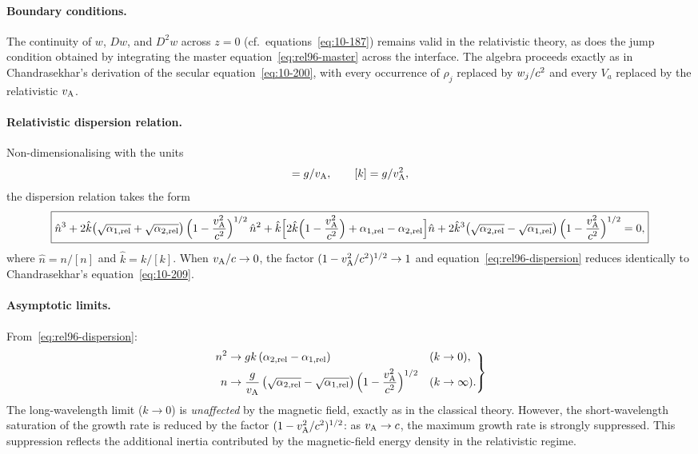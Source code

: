 \paragraph{Boundary conditions.}
The continuity of $w$, $Dw$, and $D^{2}w$ across $z=0$ (cf.\
equations~\eqref{eq:10-187}) remains valid in the relativistic theory,
as does the jump condition obtained by integrating the master
equation~\eqref{eq:rel96-master} across the interface.  The algebra
proceeds exactly as in Chandrasekhar's derivation of the secular
equation~\eqref{eq:10-200}, with every occurrence of $\rho_{j}$
replaced by $w_{j}/c^{2}$ and every $V_{a}$ replaced by
the relativistic $v_{\mathrm{A}}$.

\paragraph{Relativistic dispersion relation.}
Non-dimensionalising with the units
\begin{equation}
  [n] = g/\vA,\qquad [k] = g/\vA^{2},
  \label{eq:rel96-units}
\end{equation}
the dispersion relation takes the form
\begin{equation}
  \boxed{%
  \hat{n}^{3}
    + 2\hat{k}\bigl(\sqrt{\alpha_{1,\text{rel}}}
      +\sqrt{\alpha_{2,\text{rel}}}\bigr)\,
      \Bigl(1-\frac{\vA^{2}}{c^{2}}\Bigr)^{1/2}\,\hat{n}^{2}
    + \hat{k}\Bigl[2\hat{k}\Bigl(1-\frac{\vA^{2}}{c^{2}}\Bigr)
      +\alpha_{1,\text{rel}}-\alpha_{2,\text{rel}}\Bigr]\hat{n}
    + 2\hat{k}^{3}\bigl(\sqrt{\alpha_{2,\text{rel}}}
      -\sqrt{\alpha_{1,\text{rel}}}\bigr)\,
      \Bigl(1-\frac{\vA^{2}}{c^{2}}\Bigr)^{1/2}
    = 0,}
  \label{eq:rel96-dispersion}
\end{equation}
where $\hat{n}=n/[n]$ and $\hat{k}=k/[k]$.  When $v_{\mathrm{A}}/c\to0$, the
factor $(1-v_{\mathrm{A}}^{2}/c^{2})^{1/2}\to1$ and
equation~\eqref{eq:rel96-dispersion} reduces identically to
Chandrasekhar's equation~\eqref{eq:10-209}.

\paragraph{Asymptotic limits.}
From~\eqref{eq:rel96-dispersion}:
\begin{equation}
  \left.
  \begin{aligned}
    n^{2}&\to gk\,(\alpha_{2,\text{rel}}-\alpha_{1,\text{rel}})
      &&(k\to0),\\
    n &\to \frac{g}{v_{\mathrm{A}}}\,
      \bigl(\sqrt{\alpha_{2,\text{rel}}}-\sqrt{\alpha_{1,\text{rel}}}\bigr)\,
      \Bigl(1-\frac{v_{\mathrm{A}}^{2}}{c^{2}}\Bigr)^{1/2}
      &&(k\to\infty).
  \end{aligned}
  \right\}
  \label{eq:rel96-asymptotics}
\end{equation}
The long-wavelength limit ($k\to0$) is \emph{unaffected} by the
magnetic field, exactly as in the classical theory.  However, the
short-wavelength saturation of the growth rate is reduced by the
factor $(1-v_{\mathrm{A}}^{2}/c^{2})^{1/2}$: as $v_{\mathrm{A}}\to c$, the maximum growth
rate is strongly suppressed.  This suppression reflects the additional
inertia contributed by the magnetic-field energy density in the
relativistic regime.

